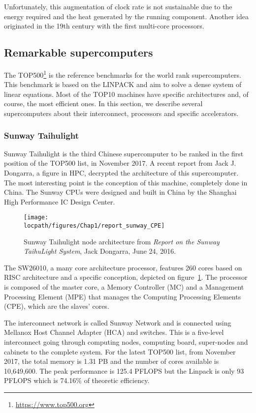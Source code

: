 Unfortunately, this augmentation of clock rate is not sustainable due to the energy required and the heat generated by the running component. 
Another idea originated in the 19th century with the first multi-core processors. 


\subsection{Remarkable supercomputers}
The TOP500\footnote{\url{https://www.top500.org}} is the reference benchmarks for the world rank supercomputers. 
This benchmark is based on the LINPACK and aim to solve a dense system of linear equations.
Most of the TOP10 machines have specific architectures and, of course, the most efficient ones. 
In this section, we describe several supercomputers about their interconnect, processors and specific accelerators. 

\subsubsection{Sunway Taihulight}
Sunway Taihulight is the third Chinese supercomputer to be ranked in the first position of the TOP500 list, in November 2017. 
A recent report from Jack J. Dongarra, a figure in HPC, decrypted the architecture of this supercomputer\cite{dongarra2016report}. 
The most interesting point is the conception of this machine, completely done in China. 
The Sunway CPUs were designed and built in China by the Shanghai High Performance IC Design Center. 

\begin{figure}[t!]
\centering
\texttt{[image: \\locpath/figures/Chap1/report\_sunway\_CPE]}
\caption{Sunway Taihulight node architecture from \textit{Report on the Sunway TaihuLight System}, Jack Dongarra, June 24, 2016.}
\label{fig:chap1_report_sunway_CPE}
\end{figure}

The SW26010, a many core architecture processor, features 260 cores based on RISC architecture and a specific conception, depicted on figure~\ref{fig:chap1_report_sunway_CPE}. 
The processor is composed of the master core, a Memory Controller (MC) and a Management Processing Element (MPE) that manages the Computing Processing Elements (CPE), which are the slaves’ cores. 

The interconnect network is called Sunway Network and is connected using Mellanox Host Channel Adapter (HCA) and switches. 
This is a five-level interconnect going through computing nodes, computing board, super-nodes and cabinets to the complete system.
For the latest TOP500 list, from November 2017, the total memory is 1.31 PB and the number of cores available is 10,649,600.
The peak performance is 125.4 PFLOPS but the Linpack is only 93 PFLOPS which is 74.16\% of theoretic efficiency. 

